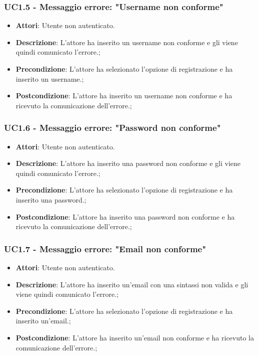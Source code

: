 \subsubsection{UC1.5 - Messaggio errore: "Username non conforme"} 
\label{sssec:UC1.5} 
\begin{itemize} 
\item \textbf{Attori}: Utente non autenticato.
\item \textbf{Descrizione}: L'attore ha inserito un username non conforme e gli viene quindi comunicato l'errore.;
\item \textbf{Precondizione}: L'attore ha selezionato l'opzione di registrazione e ha inserito un username.;
\item \textbf{Postcondizione}: L'attore ha inserito un username non conforme e ha ricevuto la comunicazione dell'errore.;
\end{itemize} 
\subsubsection{UC1.6 - Messaggio errore: "Password non conforme"} 
\label{sssec:UC1.6} 
\begin{itemize} 
\item \textbf{Attori}: Utente non autenticato.
\item \textbf{Descrizione}: L'attore ha inserito una password non conforme e gli viene quindi comunicato l'errore.;
\item \textbf{Precondizione}: L'attore ha selezionato l'opzione di registrazione e ha inserito una password.;
\item \textbf{Postcondizione}: L'attore ha inserito una password non conforme e ha ricevuto la comunicazione dell'errore.;
\end{itemize} 
\subsubsection{UC1.7 - Messaggio errore: "Email non conforme"} 
\label{sssec:UC1.7} 
\begin{itemize} 
\item \textbf{Attori}: Utente non autenticato.
\item \textbf{Descrizione}: L'attore ha inserito un'email con una sintassi non valida e gli viene quindi comunicato l'errore.;
\item \textbf{Precondizione}: L'attore ha selezionato l'opzione di registrazione e ha inserito un'email.;
\item \textbf{Postcondizione}: L'attore ha inserito un'email non conforme e ha ricevuto la comunicazione dell'errore.;
\end{itemize} 
